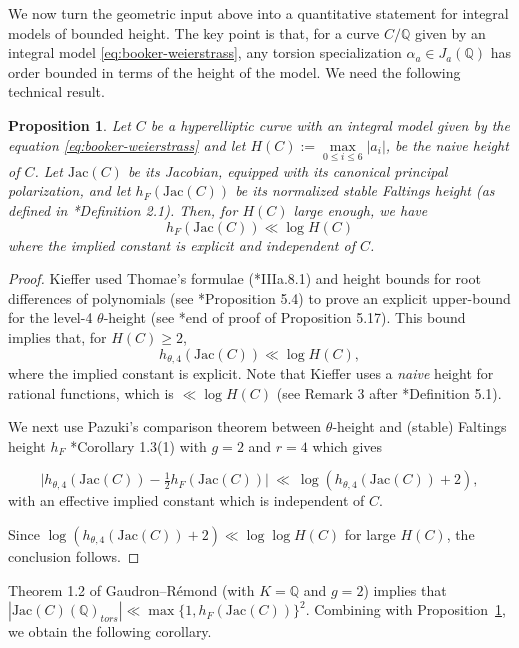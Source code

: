 \documentclass{amsart}
\newcommand{\Q}{{\mathbb Q}}
\newcommand{\Jac}{\mathrm{Jac}}
\newtheorem{proposition}{Proposition}[section]
\begin{document}
We now turn the geometric input above into a quantitative statement
for integral models of bounded height. The key point is that, for a curve
$C/\Q$ given by an integral model \eqref{eq:booker-weierstrass}, any torsion specialization
$\alpha_a\in J_a(\Q)$ has order bounded in terms of the height of the model. We need the following technical result.






\begin{proposition} \label{prop:faltings-naive} Let $C$ be a hyperelliptic curve with an integral model given by the equation \eqref{eq:booker-weierstrass} and let $H(C) := \max\limits_{0 \leq i \leq 6} |a_i|$, be the naive height of $C$. Let $\Jac(C)$ be its Jacobian, equipped with its canonical principal polarization, and let $h_F(\Jac(C))$ be its normalized stable Faltings height (as defined in \cite{Pazuki2012}*{Definition 2.1}). Then, for $H(C)$ large enough, we have
$$ h_F(\Jac(C)) \ll \log H(C)$$
where the implied constant is explicit and independent of $C$.

\end{proposition}

\begin{proof}
Kieffer used Thomae's formulae (\cite{Mumford1984}*{IIIa.8.1}) and height bounds for root differences of polynomials (see \cite{Kieffer2022}*{Proposition 5.4}) to prove an explicit upper-bound for the level-4 $\theta$-height (see \cite{Kieffer2022}*{end of proof of Proposition 5.17}). This bound implies that, for $H(C) \geq 2$,
$$ h_{\theta,4}(\Jac(C)) \ll \log H(C),$$  where the implied constant is explicit. Note that Kieffer uses a \textit{naive} height for rational functions, which is  $ \ll \log H(C)$ (see Remark 3 after \cite{Kieffer2022}*{Definition 5.1}).

We next use Pazuki's comparison theorem between $\theta$-height and (stable) Faltings height $h_F$ \cite{Pazuki2012}*{Corollary 1.3(1)} with $g=2$ and $r=4$ which gives

\[
\bigl|h_{\theta,4}(\Jac(C))-\tfrac12 h_F(\Jac(C))\bigr|\ \ll\ \log(h_{\theta,4}(\Jac(C))+2),
\]
with an effective implied constant which is independent of $C$. 

Since $\log(h_{\theta,4}(\Jac(C))+2) \ll \log \log H(C)$ for large $H(C)$, the conclusion follows. 

\end{proof}

Theorem 1.2 of Gaudron--R\'emond \cite{GaudronRemond2025} (with $K=\Q$ and $g=2$) implies that
$|\Jac(C)(\Q)_{tors}|\ll \max\{1,h_F(\Jac(C))\}^2$.
Combining with Proposition~\ref{prop:faltings-naive}, we obtain the following corollary.
\end{document}
